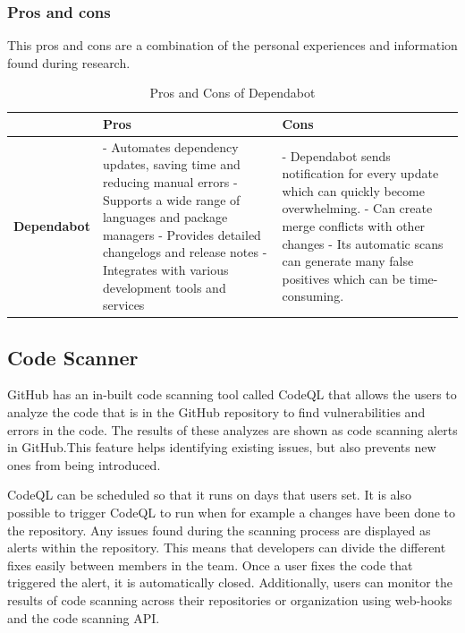\subsubsection{Pros and cons}
This pros and cons are a combination of the personal experiences and information found during research. \cite{prosconsdependabot} 

\begin{table}[H]
\centering
\begin{tabular}{|c|p{6cm}|p{6cm}|}
\hline
 & \textbf{Pros} & \textbf{Cons} \\
\hline
\textbf{Dependabot} & 
- Automates dependency updates, saving time and reducing manual errors \newline
- Supports a wide range of languages and package managers \newline
- Provides detailed changelogs and release notes \newline
- Integrates with various development tools and services &
- Dependabot sends notification for every update which can quickly 
  become overwhelming. \newline
- Can create merge conflicts with other changes \newline
- Its automatic scans can generate many false positives which can be 
  time-consuming. \\
\hline
\end{tabular}
\caption{Pros and Cons of Dependabot}
\label{tab:dependabot}
\end{table}


\subsection{Code Scanner}
GitHub has an in-built code scanning tool called CodeQL that allows the users to analyze the code that is in the GitHub repository to find vulnerabilities and errors in the code. The results of these analyzes are shown as code scanning alerts in GitHub.This feature helps identifying existing issues, but also prevents new ones from being introduced. \cite{CodeQL1}

CodeQL can be scheduled so that it runs on days that users set. It is also possible to trigger CodeQL to run when for example a changes have been done to the repository.
 Any issues found during the scanning process are displayed as alerts within the repository. This means that developers can divide the different fixes easily between members in the team.  Once a user fixes the code that triggered the alert, it is automatically closed. Additionally, users can monitor the results of code scanning across their repositories or organization using web-hooks and the code scanning API. 
\cite{GithubCodeScanning}

